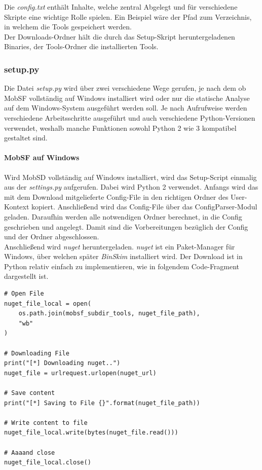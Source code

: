 Die \textit{config.txt} enthält Inhalte, welche zentral Abgelegt und für verschiedene Skripte eine wichtige Rolle spielen. Ein Beispiel wäre der Pfad zum Verzeichnis, in welchem die Tools gespeichert werden.\\

Der Downloads-Ordner hält die durch das Setup-Skript heruntergeladenen Binaries, der Tools-Ordner die installierten Tools.

\subsubsection{setup.py}
Die Datei \textit{setup.py} wird über zwei verschiedene Wege gerufen, je nach dem ob MobSF vollständig auf Windows installiert wird oder nur die statische Analyse auf dem Windows-System ausgeführt werden soll. Je nach Aufrufweise werden verschiedene Arbeitsschritte ausgeführt und auch verschiedene Python-Versionen verwendet, weshalb manche Funktionen sowohl Python 2 wie 3 kompatibel gestaltet sind.

\paragraph{MobSF auf Windows}
Wird MobSD vollständig auf Windows installiert, wird das Setup-Script einmalig aus der \textit{settings.py} aufgerufen. Dabei wird Python 2 verwendet. Anfangs wird das mit dem Download mitgelieferte Config-File in den richtigen Ordner des User-Kontext kopiert. Anschließend wird das Config-File über das ConfigParser-Modul geladen. Daraufhin werden alle notwendigen Ordner berechnet, in die Config geschrieben und angelegt. Damit sind die Vorbereitungen bezüglich der Config und der Ordner abgeschlossen.\\

Anschließend wird \textit{nuget} heruntergeladen. \textit{nuget} ist ein Paket-Manager für Windows, über welchen später \textit{BinSkim} installiert wird. Der Download ist in Python relativ einfach zu implementieren, wie in folgendem Code-Fragment dargestellt ist.
\begin{lstlisting}
# Open File
nuget_file_local = open(
	os.path.join(mobsf_subdir_tools, nuget_file_path), 
	"wb"
)

# Downloading File
print("[*] Downloading nuget..")
nuget_file = urlrequest.urlopen(nuget_url)

# Save content
print("[*] Saving to File {}".format(nuget_file_path))

# Write content to file
nuget_file_local.write(bytes(nuget_file.read()))

# Aaaand close
nuget_file_local.close()
\end{lstlisting}


